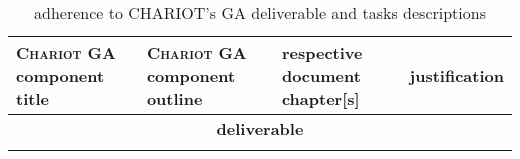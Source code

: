 \begin{table}
  \caption{\label{tab:mapchariot} adherence to CHARIOT's GA deliverable and tasks descriptions}
  \medskip
  \begin{relsize}{-1.3}
    \begin{tabular}{|p{}|p{}|p{}|p{}|}
      \hline \textbf{\textsc{Chariot} GA component title} &
      \textbf{\textsc{Chariot} GA component outline} &
      \textbf{respective document chapter[s]} & \textbf{justification}
      \\ \hline \multicolumn{4}{|c|}{{\large \textbf{deliverable}}}
      \\
      \hline
%
      \begin{minipage}[t]{0.18\textwidth}
        \smallskip
        

\end{minipage}
\end{tabular}
\end{relsize}
\end{table}
